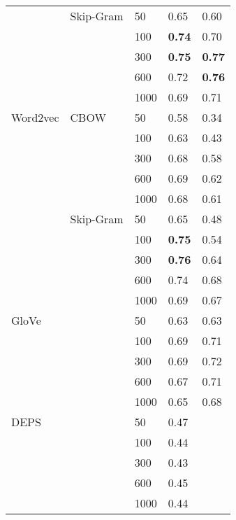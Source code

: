 \begin{table}[]
\begin{minipage}{.65\textwidth}
\begin{tabular}{@{}lllll@{}}
                    & Skip-Gram     & 50   & 0.65             & 0.60            \\
                    &               & 100  & \textbf{0.74}    & 0.70            \\
                    &               & 300  & \textbf{0.75}    & \textbf{0.77}   \\
                    &               & 600  & 0.72             & \textbf{0.76}   \\
                    &               & 1000 & 0.69             & 0.71            \\ \cmidrule(r){1-5}
Word2vec            & CBOW          & 50   & 0.58             & 0.34            \\
                    &               & 100  & 0.63             & 0.43            \\
                    &               & 300  & 0.68             & 0.58            \\
                    &               & 600  & 0.69             & 0.62            \\
                    &               & 1000 & 0.68             & 0.61            \\ \cmidrule(lr){2-5}
                    & Skip-Gram     & 50   & 0.65             & 0.48            \\
                    &               & 100  & \textbf{0.75}    & 0.54            \\
                    &               & 300  & \textbf{0.76}    & 0.64            \\
                    &               & 600  & 0.74             & 0.68            \\
                    &               & 1000 & 0.69             & 0.67            \\ \cmidrule(r){1-5}
GloVe               &               & 50   & 0.63             & 0.63            \\
                    &               & 100  & 0.69             & 0.71            \\
                    &               & 300  & 0.69             & 0.72            \\
                    &               & 600  & 0.67             & 0.71            \\
                    &               & 1000 & 0.65             & 0.68            \\ \cmidrule(r){1-5}
DEPS                &               & 50   & 0.47             \\
                    &               & 100  & 0.44             \\
                    &               & 300  & 0.43             \\
                    &               & 600  & 0.45             \\
                    &               & 1000 & 0.44             \\ \cmidrule(r){1-5}
\end{tabular}
\end{minipage}
\end{table}


